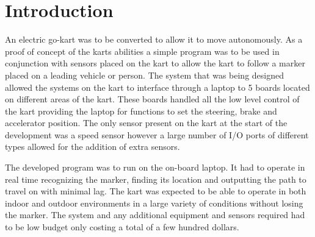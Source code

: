 \section{Introduction}

An electric go-kart was to be converted to allow it to move autonomously. As a proof of concept of the karts abilities a simple program was to be used in conjunction with sensors placed on the kart to allow the kart to follow a marker placed on a leading vehicle or person. The system that was being designed allowed the systems on the kart to interface through a laptop to 5 boards located on different areas of the kart. These boards handled all the low level control of the kart providing the laptop for functions to set the steering, brake and accelerator position. The only sensor present on the kart at the start of the development was a speed sensor however a large number of I/O ports of different types allowed for the addition of extra sensors.  

The developed program was to run on the on-board laptop. It had to operate in real time recognizing the marker, finding its location and outputting the path to travel on with minimal lag. The kart was expected to be able to operate in both indoor and outdoor environments in a large variety of conditions without losing the marker. The system and any additional equipment and sensors required had to be low budget only costing a total of a few hundred dollars.